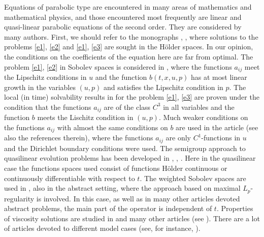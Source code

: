 \documentclass{article}
\theoremstyle{plain}
\begin{document}
Equations of parabolic type are encountered in many areas of mathematics and mathematical physics, and those encountered most frequently are linear and quasi-linear parabolic equations of the second order. They  are considered by many authors. First, we should refer  to the monographs \cite{lad}, \cite{lie}, where solutions to the problems 
\eqref{e1}, \eqref{e2} and  \eqref{e1}, \eqref{e3} are sought   in the H\"{o}lder spaces. In our opinion,  the conditions on the coefficients of the equation here are far from optimal.
The problem \eqref{e1}, \eqref{e2} in Sobolev spaces is  considered in \cite[Theorem 4, Ch. 15, Sect. 1]{kry1}, where the functions $a_{ij}$ meet the Lipschitz conditions in $u$ and the function 
  $b(t,x,u,p)$ has at most linear growth in the variables $(u,p) $ and satisfies the Lipschitz condition in $p$.
The local (in time) solvability results in \cite{wei} for the problem  \eqref{e1}, \eqref{e3} are proven under the condition that the functions $a_{ij}$ are of the class $C^3$ in all variables
and the function $b$ meets the Lischitz condition in $(u,p)$. 
Much weaker conditions on the functions $a_{ij}$ with  almost the same conditions on $b$ are used in the article \cite{res} (see also the references therein), where the functions $a_{ij}$ are only $C^1$-functions in $u$ and the Dirichlet boundary conditions were used.
The semigroup approach to quasilinear evolution problems  has been developed  in \cite{lun}, \cite{yagi}, \cite{ama1}. Here in the quasilinear case the functions spaces used consist of functions H\"{o}lder continuous or continuously differentiable with respect to $t$. The weighted Sobolev spaces 
are used in \cite{cro}, \cite{koh} also in the abstract setting, where the approach based on maximal $L_p$-regularity is involved. In this case, as well as in many other 
articles devoted abstract problems,   the main part of the operator is independent of $t$. 
Properties of viscosity solutions are studied in \cite{silv} and many other articles (see \cite{kry1}). There are a lot of articles devoted to different model cases (see, for instance, \cite{maz1}).
  
\end{document}
